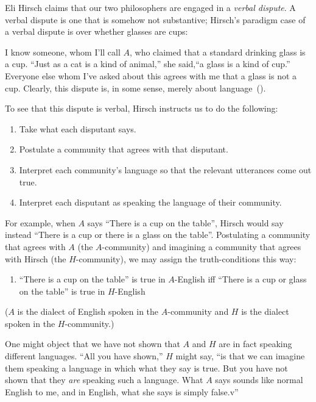 \documentclass[11pt]{article}
\newenvironment{squote}{%
\begin{spacing}{1}
       	\begin{list}{}{%
\setlength{\labelwidth}{0pt}%
\rightmargin\leftmargin%
}
\item\relax
}{%
\end{list}%
\end{spacing}
}
\begin{document}
\begin{spacing}{1.25}
Eli Hirsch claims that our two philosophers are engaged in a {\em
  verbal dispute}.  A verbal dispute is one that is somehow not
substantive; Hirsch's paradigm case of a verbal dispute is over
whether glasses are cups:

\begin{squote}
  I know someone, whom I'll call $A$, who claimed that a standard
  drinking glass is a cup.  ``Just as a cat is a kind of animal,'' she
  said,``a glass is a kind of cup.''  Everyone else whom I've asked
  about this agrees with me that a glass is not a cup.  Clearly, this
  dispute is, in some sense, merely about
  language~(\citeyear[69]{hirsch2005}).
\end{squote}

To see that this dispute is verbal, Hirsch instructs us to do the
following:

\begin{enumerate}
  \item Take what each disputant says.
  \item Postulate a community that agrees with that disputant.
  \item Interpret each community's language so that the relevant
    utterances come out true.
  \item Interpret each disputant as speaking the language of their
    community.
\end{enumerate}

For example, when $A$ says ``There is a cup on the table'', Hirsch
would say instead ``There is a cup or there is a glass on the table''.
Postulating a community that agrees with $A$ (the $A$-community) and
imagining a community that agrees with Hirsch (the $H$-community), we
may assign the truth-conditions this way:
\begin{enumerate}[itemindent=25pt, label=(T)]
    \item ``There is a cup on the table'' is true in $A$-English iff
    ``There is a cup or glass on the table'' is true in $H$-English
\end{enumerate}
($A$ is the dialect of English spoken in the $A$-community and $H$ is
the dialect spoken in the $H$-community.)

One might object that we have not shown that $A$ and $H$ are in fact
speaking different languages.  ``All you have shown,'' $H$
might say, ``is that we can imagine them speaking a language in which
what they say is true.  But you have not shown that they {\em are}
speaking such a language.  What $A$ says sounds like normal English to
me, and in English, what she says is simply false.v''


\end{spacing}
\end{document}
